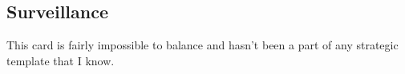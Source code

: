 \subsection{Surveillance}

This card is fairly impossible to balance and hasn't been a part of any strategic template that I know. 